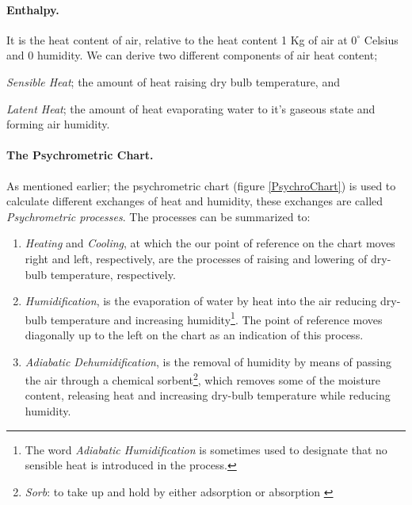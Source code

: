 \documentclass[a4paper,twoside,12pt,openright,final,oldfontcommands]{memoir}
\begin{document}
\paragraph{Enthalpy.}It is the heat content of air, relative to the heat content 1 Kg of air at
$0^\circ$ Celsius and 0 humidity. We can derive two different components of air heat content; 
\begin{inparaenum}
\item \emph{Sensible Heat}; the amount of heat raising dry bulb temperature, and
\item \emph{Latent Heat}; the amount of heat evaporating water to it's gaseous state and forming
air humidity.
\end{inparaenum}

\paragraph{The Psychrometric Chart.}As mentioned earlier; the psychrometric chart
(figure \ref{PsychroChart}) is used to calculate different exchanges of heat and
humidity, these exchanges are called \emph{Psychrometric processes}. The processes can be summarized to:
\begin{enumerate}
  \item \emph{Heating} and \emph{Cooling}, at which the our point of reference on the chart moves
  right and left, respectively, are the processes of raising and lowering of dry-bulb temperature,
  respectively.
  \item \emph{Humidification}, is the evaporation of water by heat into the air reducing dry-bulb
  temperature and increasing humidity\footnote{The word \emph{Adiabatic Humidification} is sometimes
  used to designate that no sensible heat is introduced in the process.}. The point of reference
  moves diagonally up to the left on the chart as an indication of this process.
  \item \emph{Adiabatic Dehumidification}, is the removal of humidity by means of passing the air
  through a chemical sorbent\footnote{\emph{Sorb}: to take up and hold by either adsorption or
  absorption \cite{merriam03}}, which removes some of the moisture content, releasing heat and
  increasing dry-bulb temperature while reducing humidity.
\end{enumerate}
\end{document}
